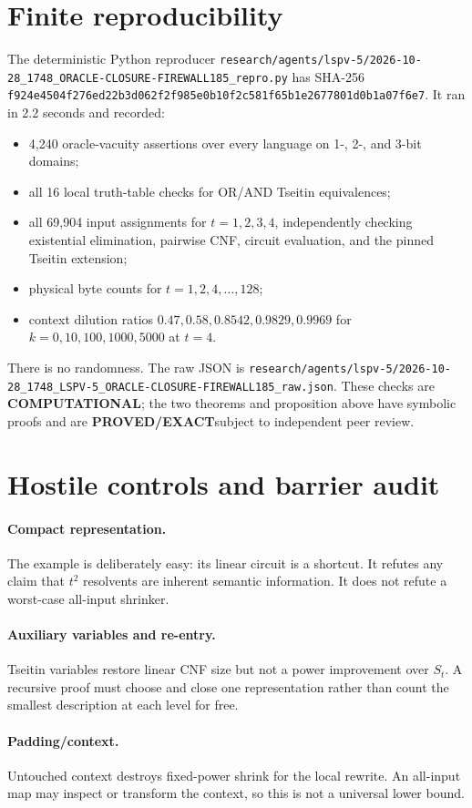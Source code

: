\documentclass[11pt]{article}
\newcommand{\PROVED}{\textbf{PROVED/EXACT}}
\newcommand{\COMP}{\textbf{COMPUTATIONAL}}
\begin{document}
\section{Finite reproducibility}
The deterministic Python reproducer
\texttt{research/agents/lspv-5/2026-10-28\_1748\_ORACLE-CLOSURE-FIREWALL185\_repro.py}
has SHA-256
\texttt{f924e4504f276ed22b3d062f2f985e0b10f2c581f65b1e2677801d0b1a07f6e7}.
It ran in 2.2 seconds and recorded:
\begin{itemize}
\item 4,240 oracle-vacuity assertions over every language on 1-, 2-, and
      3-bit domains;
\item all 16 local truth-table checks for OR/AND Tseitin equivalences;
\item all 69,904 input assignments for $t=1,2,3,4$, independently checking
      existential elimination, pairwise CNF, circuit evaluation, and the
      pinned Tseitin extension;
\item physical byte counts for $t=1,2,4,\ldots,128$;
\item context dilution ratios $0.47,0.58,0.8542,0.9829,0.9969$ for
      $k=0,10,100,1000,5000$ at $t=4$.
\end{itemize}
There is no randomness.  The raw JSON is
\texttt{research/agents/lspv-5/2026-10-28\_1748\_LSPV-5\_ORACLE-CLOSURE-FIREWALL185\_raw.json}.
These checks are \COMP; the two theorems and proposition above have symbolic
proofs and are \PROVED subject to independent peer review.

\section{Hostile controls and barrier audit}
\paragraph{Compact representation.} The example is deliberately easy: its
linear circuit is a shortcut.  It refutes any claim that $t^2$ resolvents are
inherent semantic information.  It does not refute a worst-case all-input
shrinker.
\paragraph{Auxiliary variables and re-entry.} Tseitin variables restore linear
CNF size but not a power improvement over $S_t$.  A recursive proof must choose
and close one representation rather than count the smallest description at
each level for free.
\paragraph{Padding/context.} Untouched context destroys fixed-power shrink for
the local rewrite.  An all-input map may inspect or transform the context, so
this is not a universal lower bound.
\end{document}
